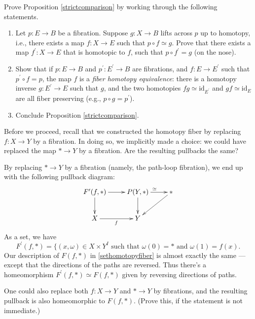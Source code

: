 \begin{exercise}
    Prove Proposition \ref{strictcomparison} by working through the following statements.
    \begin{enumerate}
	\item Let $p:E\to B$ be a fibration.
	    Suppose $g:X \to B$ lifts across $p$ up to homotopy, i.e., there exists a map $f:X\to E$ such that
	    $p \circ f \simeq g$.
	    Prove that there exists a map $f^\prime:X\to E$ that is homotopic to $f$, such that $p \circ f^\prime = g$
	    (on the nose).
	\item Show that if $p:E\to B$ and $p^\prime:E^\prime \to B$ are fibrations, and $f:E \to E^\prime$ such that
	    $p^\prime \circ f = p$, the map $f$ is a \emph{fiber homotopy equivalence}: there is a homotopy inverse
	    $g: E^\prime \to E$ such that $g$, and the two homotopies $fg \simeq \mathrm{id}_{E^\prime}$ and
	    $gf \simeq \mathrm{id}_{E}$ are all fiber preserving (e.g., $p\circ g = p^\prime$).
	\item Conclude Proposition \ref{strictcomparison}.
   \end{enumerate}
\end{exercise}

Before we proceed, recall that we constructed the homotopy fiber by replacing $f:X\to Y$ by a fibration.
In doing so, we implicitly made a choice: we could have replaced the map $\ast\to Y$ by a fibration.
Are the resulting pullbacks the same?

By replacing $\ast \to Y$ by a fibration (namely, the path-loop fibration), we end up with the following pullback diagram:
\begin{equation*}
    \xymatrix{
	F^\prime(f,\ast)\ar[r]\ar[d] & P(Y,\ast)\ar[r]^{\simeq}\ar[d] & \ast\ar[dl]\\
	X\ar[r]_f & Y & 
    }
\end{equation*}
As a set, we have
$$F^\prime(f,\ast) = \{(x,\omega)\in X\times Y^I\text{ such that }\omega(0) = \ast\text{ and }\omega(1) = f(x).$$
Our description of $F(f,\ast)$ in \eqref{sethomotopyfiber} is almost exactly the same --- except that
the directions of the paths are reversed.
Thus there's a homeomorphism $F^\prime(f,\ast) \simeq F(f,\ast)$ given by reversing directions of paths.
\begin{remark}
    One could also replace both $f:X\to Y$ and $\ast\to Y$ by fibrations, and the resulting pullback is also homeomorphic
    to $F(f,\ast)$. (Prove this, if the statement is not immediate.)
\end{remark}

